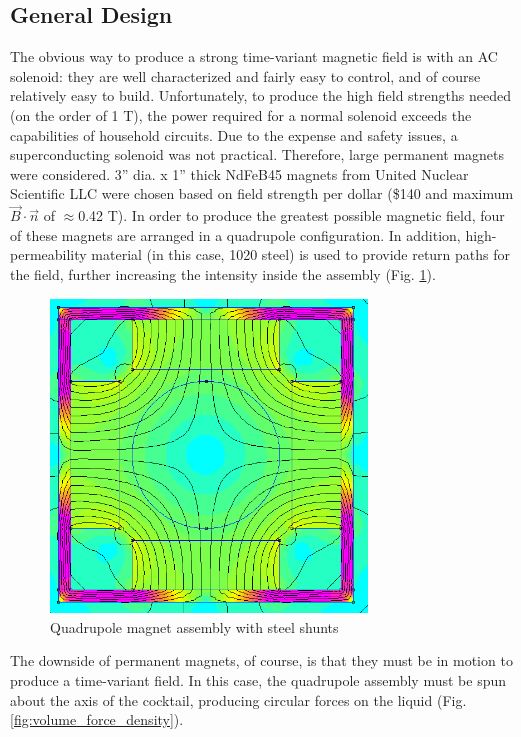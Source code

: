 \documentclass[]{article}
\begin{document}
\subsection{General Design}
\par The obvious way to produce a strong time-variant magnetic field is with an AC solenoid: they are well characterized and fairly easy to control, and of course relatively easy to build. Unfortunately, to produce the high field strengths needed (on the order of 1 T), the power required for a normal solenoid exceeds the capabilities of household circuits. Due to the expense and safety issues, a superconducting solenoid was not practical. Therefore, large permanent magnets were considered. 3'' dia. x 1'' thick NdFeB45 magnets from United Nuclear Scientific LLC were chosen based on field strength per dollar (\$140 and maximum $\vec{B}\cdot\vec{n}$ of $\approx$0.42 T). In order to produce the greatest possible magnetic field, four of these magnets are arranged in a quadrupole configuration. In addition, high-permeability material (in this case, 1020 steel) is used to provide return paths for the field, further increasing the intensity inside the assembly (Fig. \ref{fig:field_in_cup}).
\begin{figure}[h!]
	\centering
	\includegraphics[width=0.75\textwidth]{FieldInCup}
	\caption{Quadrupole magnet assembly with steel shunts}
	\label{fig:field_in_cup}
\end{figure}
\par The downside of permanent magnets, of course, is that they must be in motion to produce a time-variant field. In this case, the quadrupole assembly must be spun about the axis of the cocktail, producing circular forces on the liquid (Fig. \ref{fig:volume_force_density}).
\end{document}
